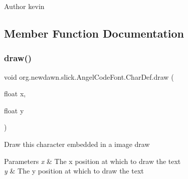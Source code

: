 \begin{DoxyAuthor}{Author}
kevin 
\end{DoxyAuthor}


\subsection{Member Function Documentation}
\mbox{\label{classorg_1_1newdawn_1_1slick_1_1_angel_code_font_1_1_char_def_a059a3e0c81e8612caea0697be5a14b75}} 
\subsubsection{\texorpdfstring{draw()}{draw()}}
{\footnotesize\ttfamily void org.\+newdawn.\+slick.\+Angel\+Code\+Font.\+Char\+Def.\+draw (\begin{DoxyParamCaption}\item[{float}]{x,  }\item[{float}]{y }\end{DoxyParamCaption})\hspace{0.3cm}{\ttfamily [inline]}}

Draw this character embedded in a image draw


\begin{DoxyParams}{Parameters}
{\em x} & The x position at which to draw the text \\
\hline
{\em y} & The y position at which to draw the text \\
\hline
\end{DoxyParams}

